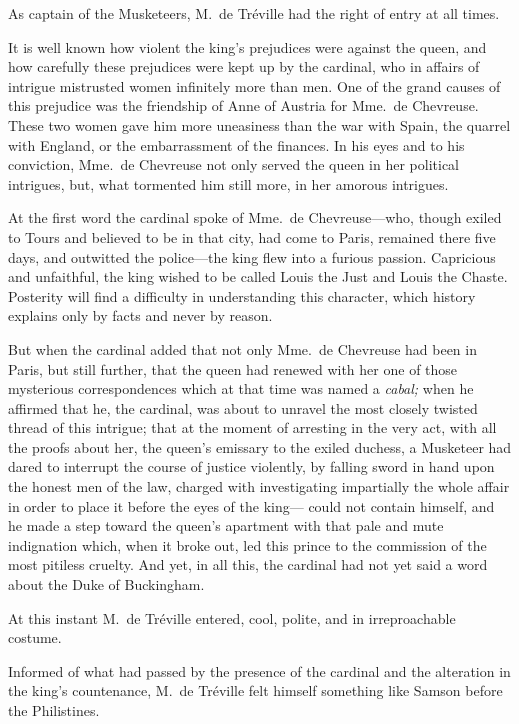 As captain of the Musketeers, M.~de Tréville had the right of entry at all times. 

It is well known how violent the king's prejudices were against the queen, and how carefully these prejudices were kept up by the cardinal, who in affairs of intrigue mistrusted women infinitely more than men. One of the grand causes of this prejudice was the friendship of Anne of Austria for Mme.~de Chevreuse. These two women gave him more uneasiness than the war with Spain, the quarrel with England, or the embarrassment of the finances. In his eyes and to his conviction, Mme.~de Chevreuse not only served the queen in her political intrigues, but, what tormented him still more, in her amorous intrigues. 

At the first word the cardinal spoke of Mme.~de Chevreuse—who, though exiled to Tours and believed to be in that city, had come to Paris, remained there five days, and outwitted the police—the king flew into a furious passion. Capricious and unfaithful, the king wished to be called Louis the Just and Louis the Chaste. Posterity will find a difficulty in understanding this character, which history explains only by facts and never by reason. 

But when the cardinal added that not only Mme.~de Chevreuse had been in Paris, but still further, that the queen had renewed with her one of those mysterious correspondences which at that time was named a \textit{cabal;} when he affirmed that he, the cardinal, was about to unravel the most closely twisted thread of this intrigue; that at the moment of arresting in the very act, with all the proofs about her, the queen's emissary to the exiled duchess, a Musketeer had dared to interrupt the course of justice violently, by falling sword in hand upon the honest men of the law, charged with investigating impartially the whole affair in order to place it before the eyes of the king— could not contain himself, and he made a step toward the queen's apartment with that pale and mute indignation which, when it broke out, led this prince to the commission of the most pitiless cruelty. And yet, in all this, the cardinal had not yet said a word about the Duke of Buckingham. 

At this instant M.~de Tréville entered, cool, polite, and in irreproachable costume. 

Informed of what had passed by the presence of the cardinal and the alteration in the king's countenance, M.~de Tréville felt himself something like Samson before the Philistines. 


